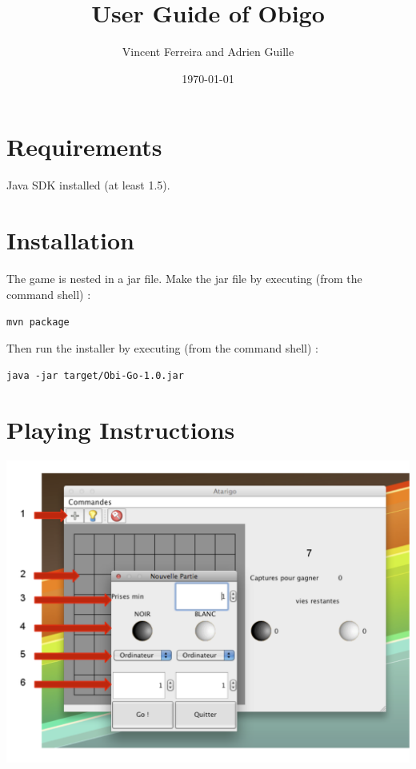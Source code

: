\documentclass[a4paper]{ltxguide}
\title{User Guide of Obigo}
\author{Vincent Ferreira and Adrien Guille}
\date{\today}
\begin{document}
\maketitle
\tableofcontents

\section{Requirements}

Java SDK installed (at least 1.5).

\section{Installation}

The game is nested in a jar file.
Make the jar file by executing (from the command shell) :

\begin{center}
\texttt{mvn package}
\end{center}
Then run the installer by executing (from the command shell) :

\begin{center}
\texttt{java -jar target/Obi-Go-1.0.jar}
\end{center}
\section{Playing Instructions}

\begin{center}
	\includegraphics[scale=0.50]{images/capture}
\end{center}
\end{document}
